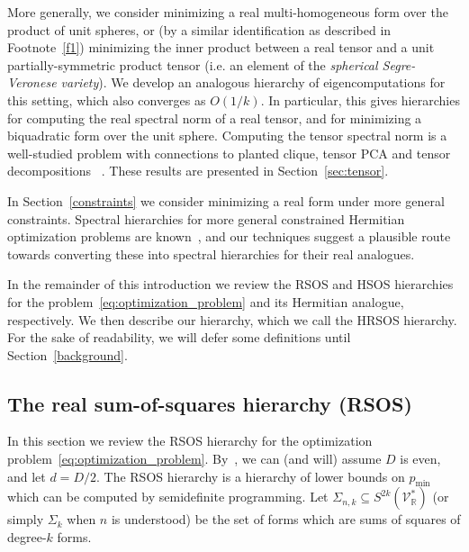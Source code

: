 \documentclass[11pt]{article}
\numberwithin{theorem}{section}
\theoremstyle{definition}
\newcommand{\real}{\mathbb{R}}
\newcommand\V{\mathcal{V}}
\newcommand{\Vr}{\V_{\real}}
\begin{document}
More generally, we consider minimizing a real multi-homogeneous form over the product of unit spheres, or (by a similar identification as described in Footnote~\ref{f1}) minimizing the inner product between a real tensor and a unit partially-symmetric product tensor (i.e. an element of the \textit{spherical Segre-Veronese variety}). We develop an analogous hierarchy of eigencomputations for this setting, which also converges as $O(1/k)$. In particular, this gives hierarchies for computing the real spectral norm of a real tensor, and for minimizing a biquadratic form over the unit sphere. Computing the tensor spectral norm is a well-studied problem with connections to planted clique, tensor PCA and tensor decompositions ~\cite{FriezeK08, BrubakerV09, RichardM14}. These results are presented in Section~\ref{sec:tensor}.

In Section~\ref{constraints} we consider minimizing a real form under more general constraints. Spectral hierarchies for more general constrained Hermitian optimization problems are known~\cite{catlin1999isometric,DJLV24}, and our techniques suggest a plausible route towards converting these into spectral hierarchies for their real analogues.


In the remainder of this introduction we review the RSOS and HSOS hierarchies for the problem~\eqref{eq:optimization_problem} and its Hermitian analogue, respectively. We then describe our hierarchy, which we call the HRSOS hierarchy. For the sake of readability, we will defer some definitions until Section~\ref{background}.


\subsection{The real sum-of-squares hierarchy (RSOS)}
In this section we review the RSOS hierarchy for the optimization problem~\eqref{eq:optimization_problem}. By~\cite[Lemma B.2]{doherty2012convergence}, we can (and will) assume $D$ is even, and let $d=D/2$.
The RSOS hierarchy is a hierarchy of lower bounds on $p_{\min}$ which can be computed by semidefinite programming. Let $\Sigma_{n,k}\subseteq S^{2k}(\Vr^*)$ (or simply $\Sigma_k$ when $n$ is understood) be the set of forms which are sums of squares of degree-$k$ forms.
\end{document}
